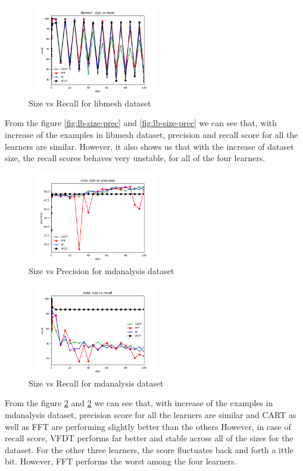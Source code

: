 \documentclass[sigplan]{acmart}\settopmatter{printfolios=true,printccs=false,printacmref=false}
\begin{document}
\begin{figure}[h]
	\includegraphics[width=6cm,height=4cm,keepaspectratio]{fig/libmesh-size-recall.png}
	\caption{Size vs Recall for libmesh dataset}
	\label{fig:lb-size-rec}
\end{figure}

From the figure \ref{fig:lb-size-prec} and \ref{fig:lb-size-prec} we can see that, with increase of the examples in libmesh dataset, precision and recall score for all the learners are similar. However, it also shows us that with the increase of dataset size, the recall scores behaves very unstable, for all of the four learners. 

\begin{figure}[h]
	\includegraphics[width=6cm,height=4cm,keepaspectratio]{fig/mda-size-precision.png}
	\caption{Size vs Precision for mdanalysis dataset}
	\label{fig:md-size-prec}
\end{figure}

\begin{figure}[h]
	\includegraphics[width=6cm,height=4cm,keepaspectratio]{fig/mda-size-recall.png}
	\caption{Size vs Recall for mdanalysis dataset}
	\label{fig:md-size-rec}
\end{figure}

From the figure \ref{fig:md-size-prec} and \ref{fig:md-size-prec} we can see that, with increase of the examples in mdanalysis dataset, precision score for all the learners are similar and CART as well as FFT are performing slightly better than the others However, in case of recall score, VFDT performs far better and stable across all of the sizes for the dataset. For the other three learners, the score fluctuates back and forth a ittle bit. However, FFT performs the worst among the four learners. 
\end{document}
